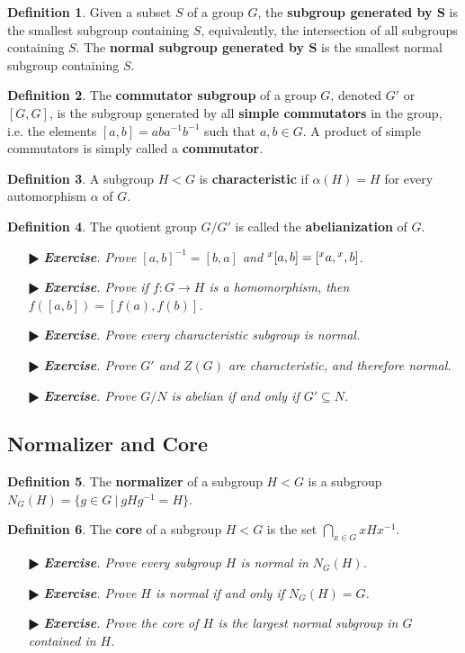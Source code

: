 \documentclass[11pt]{amsart}
\theoremstyle{definition}
\newtheorem*{definition*}{Definition}
\renewcommand\:{\colon}
\newcommand{\1}{\mathds{1}}
\newcommand{\exc}[1]{\vspace{-2.5pt}\begin{itemize}[leftmargin=15pt]\item[$\RHD$] \textit{\textbf{Exercise}. #1}\end{itemize}}
\begin{document}
\begin{definition*}
	Given a subset $S$ of a group $G$, the \textbf{subgroup generated by $\boldsymbol{S}$} is the smallest subgroup containing $S$, equivalently, the intersection of all subgroups containing $S$. The \textbf{normal subgroup generated by $\boldsymbol{S}$} is the smallest normal subgroup containing $S$.
\end{definition*}

\begin{definition*}
	The \textbf{commutator subgroup} of a group $G$, denoted $G'$ or $[G, G]$, is the subgroup generated by all \textbf{simple commutators} in the group, i.e. the elements $[a, b] = aba^{-1}b^{-1}$ such that $a, b \in G$. A product of simple commutators is simply called a \textbf{commutator}.
\end{definition*}

\begin{definition*}
	A subgroup $H < G$ is \textbf{characteristic} if $\alpha(H) = H$ for every automorphism $\alpha$ of $G$.
\end{definition*}

\begin{definition*}
	The quotient group $G/G'$ is called the \textbf{abelianization} of $G$.
\end{definition*}

\exc{Prove $[a,b]^{-1} = [b,a]$ and $\null^x[a, b] = [\null^xa, \null^x,b]$.}
\exc{Prove if $f\: G \to H$ is a homomorphism, then $f([a,b]) = [f(a), f(b)]$.}
\exc{Prove every characteristic subgroup is normal.}
\exc{Prove $G'$ and $Z(G)$ are characteristic, and therefore normal.}
\exc{Prove  $G/N$ is abelian if and only if $G' \subseteq N$.}
\vskip20pt 

\subsection*{Normalizer and Core}

\begin{definition*}
	The \textbf{normalizer} of a subgroup $H < G$ is a subgroup $N_G(H) = \{ g \in G \ | \ gHg^{-1} = H\}$.
\end{definition*}

\begin{definition*}
	The \textbf{core} of a subgroup $H < G$ is the set $\bigcap_{x \in G} xHx^{-1}$.
\end{definition*}

\exc{Prove every subgroup $H$ is normal in $N_G(H)$.}
\exc{Prove $H$ is normal if and only if $N_G(H) = G$.}
\exc{Prove the core of $H$ is the largest normal subgroup in $G$ contained in $H$.}
\end{document}
